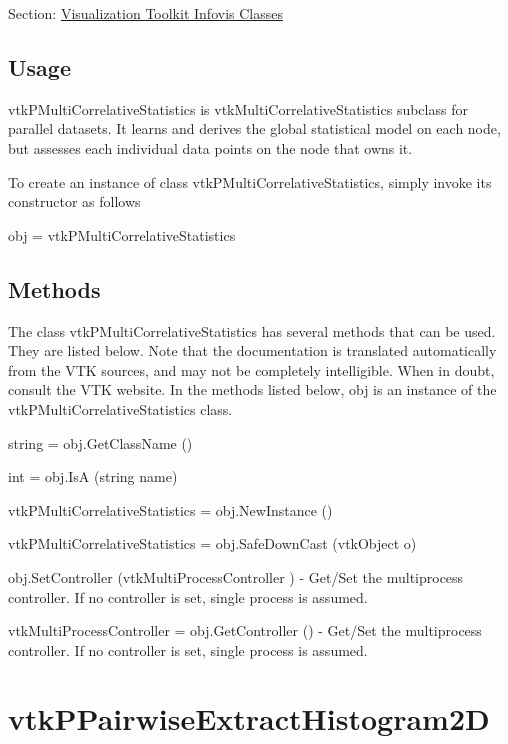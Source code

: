 Section\-: \hyperlink{sec_vtkinfovis}{Visualization Toolkit Infovis Classes} \hypertarget{vtkwidgets_vtkxyplotwidget_Usage}{}\subsection{Usage}\label{vtkwidgets_vtkxyplotwidget_Usage}
vtk\-P\-Multi\-Correlative\-Statistics is vtk\-Multi\-Correlative\-Statistics subclass for parallel datasets. It learns and derives the global statistical model on each node, but assesses each individual data points on the node that owns it.

To create an instance of class vtk\-P\-Multi\-Correlative\-Statistics, simply invoke its constructor as follows \begin{DoxyVerb}  obj = vtkPMultiCorrelativeStatistics
\end{DoxyVerb}
 \hypertarget{vtkwidgets_vtkxyplotwidget_Methods}{}\subsection{Methods}\label{vtkwidgets_vtkxyplotwidget_Methods}
The class vtk\-P\-Multi\-Correlative\-Statistics has several methods that can be used. They are listed below. Note that the documentation is translated automatically from the V\-T\-K sources, and may not be completely intelligible. When in doubt, consult the V\-T\-K website. In the methods listed below, {\ttfamily obj} is an instance of the vtk\-P\-Multi\-Correlative\-Statistics class. 
\begin{DoxyItemize}
\item {\ttfamily string = obj.\-Get\-Class\-Name ()}  
\item {\ttfamily int = obj.\-Is\-A (string name)}  
\item {\ttfamily vtk\-P\-Multi\-Correlative\-Statistics = obj.\-New\-Instance ()}  
\item {\ttfamily vtk\-P\-Multi\-Correlative\-Statistics = obj.\-Safe\-Down\-Cast (vtk\-Object o)}  
\item {\ttfamily obj.\-Set\-Controller (vtk\-Multi\-Process\-Controller )} -\/ Get/\-Set the multiprocess controller. If no controller is set, single process is assumed.  
\item {\ttfamily vtk\-Multi\-Process\-Controller = obj.\-Get\-Controller ()} -\/ Get/\-Set the multiprocess controller. If no controller is set, single process is assumed.  
\end{DoxyItemize}\hypertarget{vtkinfovis_vtkppairwiseextracthistogram2d}{}\section{vtk\-P\-Pairwise\-Extract\-Histogram2\-D}\label{vtkinfovis_vtkppairwiseextracthistogram2d}
